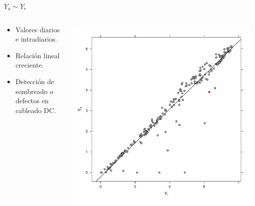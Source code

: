 \documentclass[aspectratio=169, usenames,svgnames,dvipsnames]{beamer}
\begin{document}
\begin{frame}[label={sec:orgaf9ecb1}]{\(Y_a \sim Y_r\)}
\begin{columns}
\begin{column}{0.3\columnwidth}
\begin{itemize}
\item Valores diarios e intradiarios.
\item Relación lineal creciente.
\item Detección de sombreado o defectos en cableado DC.
\end{itemize}
\end{column}

\begin{column}{0.7\columnwidth}
\begin{center}
\includegraphics[height=0.95\textheight]{../figs/YaYr.pdf}
\end{center}
\end{column}
\end{columns}
\end{frame}
\end{document}
